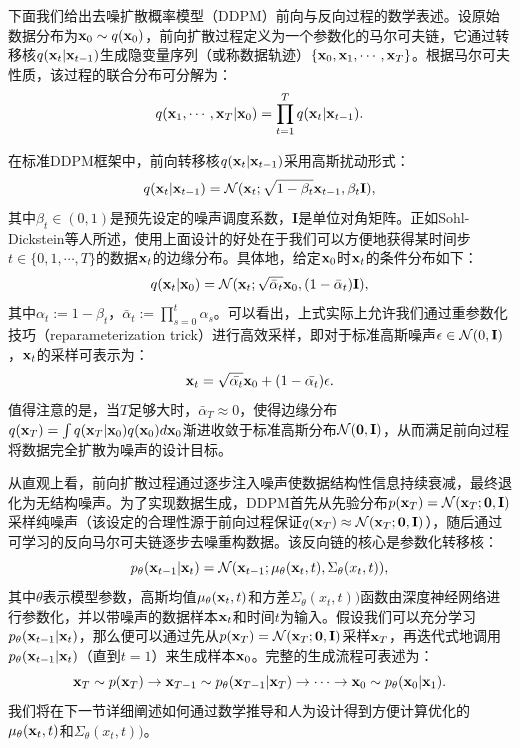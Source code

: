 \documentclass[11pt,a4paper,UTF8]{ctexart}
\begin{document}
下面我们给出去噪扩散概率模型（DDPM）前向与反向过程的数学表述。设原始数据分布为$\mathbf{x}_0\sim q(\mathbf{x}_0)$，前向扩散过程定义为一个参数化的马尔可夫链，它通过转移核$q(\mathbf{x}_t|\mathbf{x}_{t-1})$生成隐变量序列（或称数据轨迹）$\{\mathbf{x}_0,\mathbf{x}_1,\cdots,\mathbf{x}_T\}$。根据马尔可夫性质，该过程的联合分布可分解为：
\begin{equation*}
    q(\mathbf{x}_1,\cdots,\mathbf{x}_T|\mathbf{x}_0)=\prod_{t=1}^T q(\mathbf{x}_t|\mathbf{x}_{t-1}).
\end{equation*}

在标准DDPM框架中，前向转移核$q(\mathbf{x}_t|\mathbf{x}_{t-1})$采用高斯扰动形式：
\begin{equation}
    q(\mathbf{x}_t|\mathbf{x}_{t-1}) =\mathcal{N}(\mathbf{x}_t;\sqrt{1-\beta_t}\mathbf{x}_{t-1},\beta_t\mathbf{I}),
\label{ddpm:forward_process}
\end{equation}
其中$\beta_t\in(0,1)$是预先设定的噪声调度系数，$\mathbf{I}$是单位对角矩阵。正如Sohl-Dickstein等人\cite{sohldickstein2015diffusion}所述，使用上面设计的好处在于我们可以方便地获得某时间步$t\in\{0,1,\cdots,T\}$的数据$\mathbf{x}_t$的边缘分布。具体地，给定$\mathbf{x}_0$时$\mathbf{x}_t$的条件分布如下：
\begin{equation}
    q(\mathbf{x}_t|\mathbf{x}_0)=\mathcal{N}(\mathbf{x}_t;\sqrt{\bar{\alpha}_t}\mathbf{x}_0,(1-\bar{\alpha}_t)\mathbf{I}),
\label{ddpm:bar_alpha}
\end{equation}
其中$\alpha_t:=1-\beta_t$，$\bar{\alpha}_t:=\prod_{s=0}^t\alpha_s$。可以看出，上式实际上允许我们通过重参数化技巧（reparameterization trick）进行高效采样，即对于标准高斯噪声$\epsilon\in\mathcal{N}(0,\mathbf{I})$，$\mathbf{x}_t$的采样可表示为：
\begin{equation*}
    \mathbf{x}_t=\sqrt{\bar{\alpha_t}}\mathbf{x}_0 + (1-\bar{\alpha_t})\epsilon.
\end{equation*}
值得注意的是，当$T$足够大时，$\bar{\alpha}_T\approx 0$，使得边缘分布$q(\mathbf{x}_T)=\int q(\mathbf{x}_T|\mathbf{x}_0)q(\mathbf{x}_0)d\mathbf{x}_0$渐进收敛于标准高斯分布$\mathcal{N}(\mathbf{0},\mathbf{I})$，从而满足前向过程将数据完全扩散为噪声的设计目标。

从直观上看，前向扩散过程通过逐步注入噪声使数据结构性信息持续衰减，最终退化为无结构噪声。为了实现数据生成，DDPM首先从先验分布$p(\mathbf{x}_T)=\mathcal{N}(\mathbf{x}_T;\mathbf{0},\mathbf{I})$采样纯噪声（该设定的合理性源于前向过程保证$q(\mathbf{x}_T) \approx \mathcal{N}(\mathbf{x}_T; \mathbf{0}, \mathbf{I})$），随后通过可学习的反向马尔可夫链逐步去噪重构数据。该反向链的核心是参数化转移核：
\begin{equation*}
    p_{\theta}(\mathbf{x}_{t-1}|\mathbf{x}_t) = \mathcal{N}(\mathbf{x}_{t-1};\mu_{\theta}(\mathbf{x}_t,t),\Sigma_{\theta}(x_t,t)),
\end{equation*}
其中$\theta$表示模型参数，高斯均值$\mu_{\theta}(\mathbf{x}_t,t)$和方差$\Sigma_{\theta}(x_t,t))$函数由深度神经网络进行参数化，并以带噪声的数据样本$\mathbf{x}_t$和时间$t$为输入。假设我们可以充分学习$p_{\theta}(\mathbf{x}_{t-1}|\mathbf{x}_t)$，那么便可以通过先从$p(\mathbf{x}_T)=\mathcal{N}(\mathbf{x}_T;\mathbf{0},\mathbf{I})$采样$\mathbf{x}_T$，再迭代式地调用$p_{\theta}(\mathbf{x}_{t-1}|\mathbf{x}_t)$（直到$t=1$）来生成样本$\mathbf{x}_0$。完整的生成流程可表述为：
\begin{equation*}
\mathbf{x}_T \sim p(\mathbf{x}_T) \rightarrow \mathbf{x}_{T-1} \sim p_{\theta}(\mathbf{x}_{T-1}|\mathbf{x}_T) \rightarrow \cdots \rightarrow \mathbf{x}_0 \sim p_{\theta}(\mathbf{x}_0|\mathbf{x}_1).
\end{equation*}
我们将在下一节详细阐述如何通过数学推导和人为设计得到方便计算优化的$\mu_{\theta}(\mathbf{x}_t,t)$和$\Sigma_{\theta}(x_t,t))$。
\end{document}
